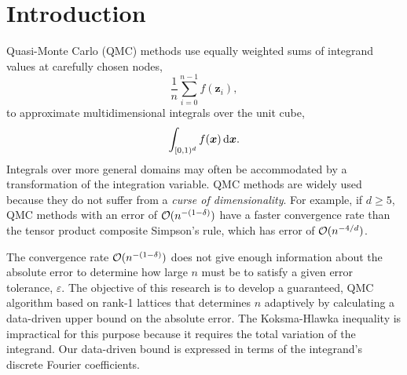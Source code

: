 \documentclass[graybox]{svmult}
\newcommand{\bsx}{\boldsymbol{x}}    %
\newcommand{\bsz}{\boldsymbol{z}}    %
\begin{document}

\section{Introduction}

Quasi-Monte Carlo (QMC) methods use equally weighted sums of integrand values at carefully chosen nodes,
\[
\frac 1n \sum_{i=0}^{n-1} f(\bsz_i), 
\]
to approximate multidimensional integrals over the unit cube,
\[
\int_{\cube} f(\bsx) \, \dif \bsx.
\]
Integrals over more general domains may often be accommodated by a transformation of the integration variable. QMC methods are widely used because they do not suffer from a \textit{curse of dimensionality}. For example, if $d \ge 5$, QMC methods with an error of $\mathcal{O}(n^{-(1-\delta)})$ have a faster convergence rate than the tensor product composite Simpson's rule, which has error of $\mathcal{O}(n^{-4/d})$.

The convergence rate $\mathcal{O}(n^{-(1-\delta)})$ does not give enough information about the absolute error to determine how large $n$ must be to satisfy a given error tolerance, $\varepsilon$. The objective of this research is to develop a guaranteed, QMC algorithm based on rank-1 lattices that determines $n$ adaptively by calculating a data-driven upper bound on the absolute error. The Koksma-Hlawka inequality is impractical for this purpose because it requires the total variation of the integrand. Our data-driven bound is expressed in terms of the integrand's discrete Fourier coefficients. 
\end{document}
